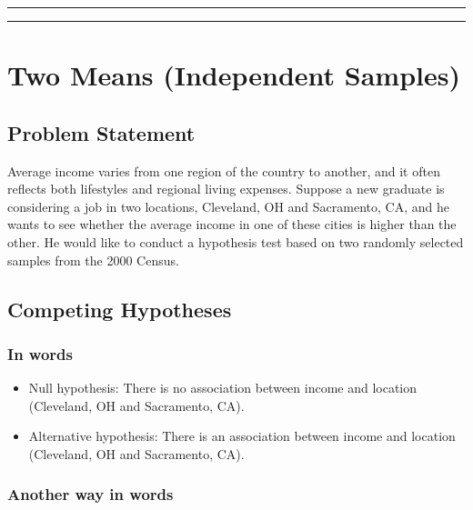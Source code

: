 \documentclass[]{tufte-book}
\let\oldrule=\rule
\renewcommand{\rule}[1]{\oldrule{\linewidth}}
\theoremstyle{definition}
\theoremstyle{definition}
\theoremstyle{remark}
\begin{document}
\begin{center}\rule{0.5\linewidth}{\linethickness}\end{center}

\begin{center}\rule{0.5\linewidth}{\linethickness}\end{center}

\section{Two Means (Independent
Samples)}\label{two-means-independent-samples}

\subsection{Problem Statement}\label{problem-statement-3}

Average income varies from one region of the country to another, and it
often reflects both lifestyles and regional living expenses. Suppose a
new graduate is considering a job in two locations, Cleveland, OH and
Sacramento, CA, and he wants to see whether the average income in one of
these cities is higher than the other. He would like to conduct a
hypothesis test based on two randomly selected samples from the 2000
Census. \citep[Tweaked a bit from][ {[}Chapter 5{]}]{isrs2014}

\subsection{Competing Hypotheses}\label{competing-hypotheses-3}

\subsubsection{In words}\label{in-words-3}

\begin{itemize}
\item
  Null hypothesis: There is no association between income and location
  (Cleveland, OH and Sacramento, CA).
\item
  Alternative hypothesis: There is an association between income and
  location (Cleveland, OH and Sacramento, CA).
\end{itemize}

\subsubsection{Another way in words}\label{another-way-in-words-1}
\end{document}
